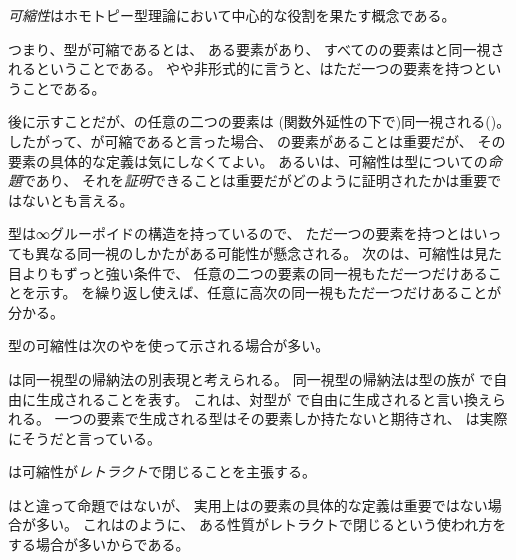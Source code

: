 \documentclass[index]{subfiles}
\begin{document}

\emph{可縮性}はホモトピー型理論において中心的な役割を果たす概念である。



つまり、型が可縮であるとは、
ある要素があり、
すべてのの要素は\myInlineMath{\myCenter}と同一視されるということである。
やや非形式的に言うと、はただ一つの要素を持つということである。

後に示すことだが、の任意の二つの要素は
(関数外延性の下で)同一視される()。
したがって、が可縮であると言った場合、
の要素があることは重要だが、
その要素の具体的な定義は気にしなくてよい。
あるいは、可縮性は型についての\emph{命題}であり、
それを\emph{証明}できることは重要だがどのように証明されたかは重要ではないとも言える。



型は∞グルーポイドの構造を持っているので、
ただ一つの要素を持つとはいっても異なる同一視のしかたがある可能性が懸念される。
次のは、可縮性は見た目よりもずっと強い条件で、
任意の二つの要素の同一視もただ一つだけあることを示す。
を繰り返し使えば、任意に高次の同一視もただ一つだけあることが分かる。



型の可縮性は次のやを使って示される場合が多い。



は同一視型の帰納法の別表現と考えられる。
同一視型の帰納法は型の族が
で自由に生成されることを表す。
これは、対型が
で自由に生成されると言い換えられる。
一つの要素で生成される型はその要素しか持たないと期待され、
は実際にそうだと言っている。

は可縮性が\emph{レトラクト}で閉じることを主張する。



はと違って命題ではないが、
実用上はの要素の具体的な定義は重要ではない場合が多い。
これはのように、
ある性質がレトラクトで閉じるという使われ方をする場合が多いからである。
\end{document}
